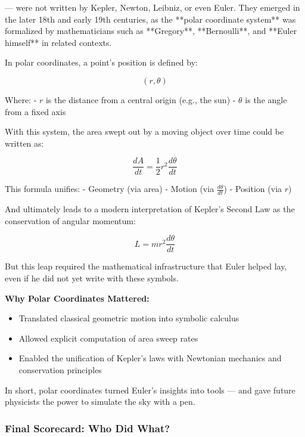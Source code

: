 — were not written by Kepler, Newton, Leibniz, or even Euler. They emerged in the later 18th and early 19th centuries, as the **polar coordinate system** was formalized by mathematicians such as **Gregory**, **Bernoulli**, and **Euler himself** in related contexts.

In polar coordinates, a point’s position is defined by:

\[
(r, \theta)
\]

Where:
- \( r \) is the distance from a central origin (e.g., the sun)
- \( \theta \) is the angle from a fixed axis

With this system, the area swept out by a moving object over time could be written as:

\[
\frac{dA}{dt} = \frac{1}{2} r^2 \frac{d\theta}{dt}
\]

This formula unifies:
- Geometry (via area)
- Motion (via \( \frac{d\theta}{dt} \))
- Position (via \( r \))

And ultimately leads to a modern interpretation of Kepler’s Second Law as the conservation of angular momentum:

\[
L = m r^2 \frac{d\theta}{dt}
\]

But this leap required the mathematical infrastructure that Euler helped lay, even if he did not yet write with these symbols.

\textbf{Why Polar Coordinates Mattered:}
\begin{itemize}
    \item Translated classical geometric motion into symbolic calculus
    \item Allowed explicit computation of area sweep rates
    \item Enabled the unification of Kepler’s laws with Newtonian mechanics and conservation principles
\end{itemize}

In short, polar coordinates turned Euler’s insights into tools — and gave future physicists the power to simulate the sky with a pen.



\subsubsection{Final Scorecard: Who Did What?}

